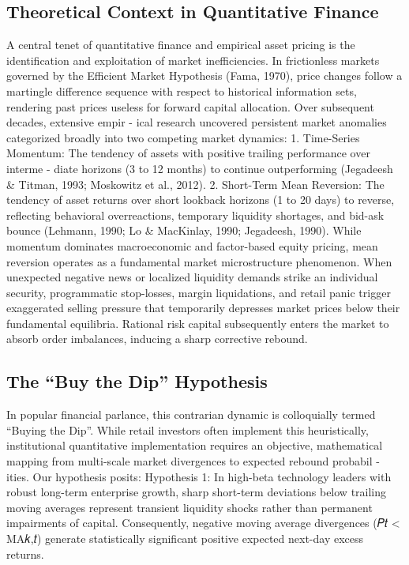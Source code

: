 \documentclass[12pt, a4paper]{article}
\begin{document}
\subsection{Theoretical Context in Quantitative Finance}
A central tenet of quantitative finance and empirical asset pricing is the identification and exploitation 
of market inefficiencies. In frictionless markets governed by the Efficient Market Hypothesis (Fama, 
1970), price changes follow a martingle difference sequence with respect to historical information sets, 
rendering past prices useless for forward capital allocation. Over subsequent decades, extensive empir -
ical research uncovered persistent market anomalies categorized broadly into two competing market 
dynamics:
1. Time-Series Momentum: The tendency of assets with positive trailing performance over interme -
diate horizons (3 to 12 months) to continue outperforming (Jegadeesh \& Titman, 1993; Moskowitz 
et al., 2012).
2. Short-Term Mean Reversion:  The tendency of asset returns over short lookback horizons (1 to 
20 days) to reverse, reflecting behavioral overreactions, temporary liquidity shortages, and bid-ask 
bounce (Lehmann, 1990; Lo \& MacKinlay, 1990; Jegadeesh, 1990).
While momentum dominates macroeconomic and factor-based equity pricing, mean reversion operates 
as a fundamental market microstructure phenomenon. When unexpected negative news or localized 
liquidity demands strike an individual security, programmatic stop-losses, margin liquidations, and 
retail panic trigger exaggerated selling pressure that temporarily depresses market prices below their 
fundamental equilibria. Rational risk capital subsequently enters the market to absorb order imbalances, 
inducing a sharp corrective rebound.

\subsection{The ``Buy the Dip'' Hypothesis}
In popular financial parlance, this contrarian dynamic is colloquially termed ``Buying the Dip''. While 
retail investors often implement this heuristically, institutional quantitative implementation requires an 
objective, mathematical mapping from multi-scale market divergences to expected rebound probabil -
ities.
Our hypothesis posits:
Hypothesis 1: In high-beta technology leaders with robust long-term enterprise growth, 
sharp short-term deviations below trailing moving averages represent transient liquidity 
shocks rather than permanent impairments of capital. Consequently, negative moving 
average divergences (𝑃𝑡 < MA{𝑘,𝑡}) generate statistically significant positive expected 
next-day excess returns.
\end{document}
